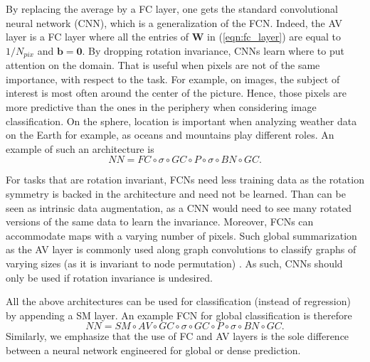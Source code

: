 \documentclass[final,twocolumn,3p,times,sort&compress]{elsarticle}
\newcommand{\eqnref}[1]{(\ref{eqn:#1})}
\renewcommand{\b}[1]{{\bm{#1}}}   %
\newcommand{\1}{\b{1}}              %
\newcommand{\0}{\b{0}}              %
\newcommand{\W}{\b{W}}
\begin{document}

By replacing the average by a FC layer, one gets the standard convolutional neural network (CNN), which is a generalization of the FCN.
Indeed, the AV layer is a FC layer where all the entries of $\W$ in \eqnref{fc_layer} are equal to $1/N_{pix}$ and $\b b = \b 0$.
By dropping rotation invariance, CNNs learn where to put attention on the domain. 
That is useful when pixels are not of the same importance, with respect to the task.
For example, on images, the subject of interest is most often around the center of the picture.
Hence, those pixels are more predictive than the ones in the periphery when considering image classification.
On the sphere, location is important when analyzing weather data on the Earth for example, as oceans and mountains play different roles.
An example of such an architecture is
\begin{equation*}
	NN = FC \circ \sigma \circ GC \circ P \circ \sigma \circ BN \circ GC.
\end{equation*}

For tasks that are rotation invariant, FCNs need less training data as the rotation symmetry is backed in the architecture and need not be learned.
Than can be seen as intrinsic data augmentation, as a CNN would need to see many rotated versions of the same data to learn the invariance.
Moreover, FCNs can accommodate maps with a varying number of pixels.
Such global summarization as the AV layer is commonly used along graph convolutions to classify graphs of varying sizes (as it is invariant to node permutation) \citep{duvenaud2015gcn, li2015gatedgnn}.
As such, CNNs should only be used if rotation invariance is undesired.


All the above architectures can be used for classification (instead of regression) by appending a SM layer.
An example FCN for global classification is therefore
\begin{equation*}
	NN = SM \circ AV \circ GC \circ \sigma \circ GC \circ P \circ \sigma \circ BN \circ GC.
\end{equation*}
Similarly, we emphasize that the use of FC and AV layers is the sole difference between a neural network engineered for global or dense prediction.
\end{document}

